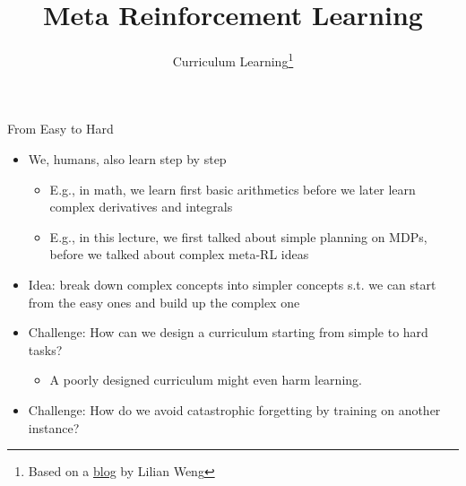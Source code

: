 


\title[Meta-RL]{Meta Reinforcement Learning}
\subtitle{Curriculum Learning\footnote{Based on a \href{https://lilianweng.github.io/lil-log/2020/01/29/curriculum-for-reinforcement-learning.html}{blog} by Lilian Weng}}



	
	\maketitle

\begin{frame}[c]{From Easy to Hard}


\begin{itemize}
	\item We, humans, also learn step by step
	\begin{itemize}
		\item E.g., in math, we learn first basic arithmetics before we later learn complex derivatives and integrals
		\item E.g., in this lecture, we first talked about simple planning on MDPs, before we talked about complex meta-RL ideas
	\end{itemize}
	\smallskip
	\item \alert{Idea:} break down complex concepts into simpler concepts s.t. we can start from the easy ones and build up the complex one
	\item \alert{Challenge}: How can we design a curriculum starting from simple to hard tasks?
	\begin{itemize}
		\item A poorly designed curriculum might even harm learning.
	\end{itemize}
	\item \alert{Challenge}: How do we avoid catastrophic forgetting by training on another instance?
\end{itemize}


\end{frame}
